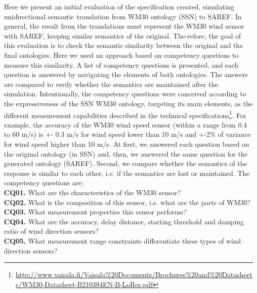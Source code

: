 \documentclass{sig-alternate-05-2015}
\begin{document}
Here we present an initial evaluation of the specification created, simulating unidirectional semantic translation from WM30 ontology (SSN) to SAREF. In general, the result from the translations must represent the WM30 wind sensor with SAREF, keeping similar semantics of the original. The-refore, the goal of this evaluation is to check the semantic similarity between the original and the final ontologies. Here we used an approach based on competency questions to measure this similarity. A list of competency questions is presented, and each question is answered by navigating the elements of both ontologies. The answers are compared to verify whether the semantics are maintained after the simulation. Intentionally, the competency questions were conceived according to the expressiveness of the SSN WM30 ontology, targeting its main elements, as the different measurement capabilities described in the technical specifications\footnote{\url{http://www.vaisala.fi/Vaisala\%20Documents/Brochures\%20and\%20Datasheets/WM30-Datasheet-B210384EN-B-LoRes.pdf}}. For example, the accuracy of the WM30 wind speed sensor (within a range from 0.4 to 60 m/s) is +- 0.3 m/s for wind speed lower than 10 m/s and +-2\% of variance for wind speed higher than 10 m/s. At first, we answered each question based on the original ontology (in SSN) and, then, we answered the same question for the generated ontology (SAREF). Second, we compare whether the semantics of the response is similar to each other, i.e. if the semantics are lost or maintained. The competency questions are: 
\\\textbf{CQ01.} What are the characteristics of the WM30 sensor? 
\\\textbf{CQ02.} What is the composition of this sensor, i.e. what are the parts of WM30?
\\\textbf{CQ03.} What measurement properties this sensor performs?
\\\textbf{CQ04.} What are the accuracy, delay distance, starting threshold and damping ratio of wind direction sensors? 
\\\textbf{CQ05.} What measurement range constraints differentiate these types of wind direction sensors?
\end{document}
